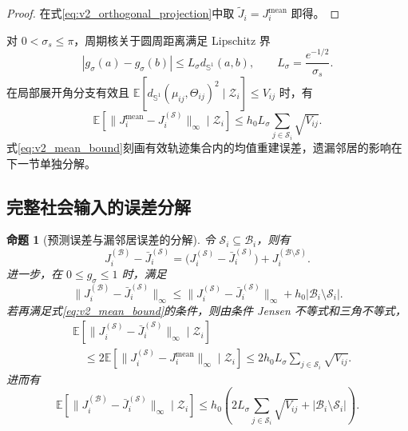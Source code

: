 \documentclass[UTF8,fontset=windows,11pt]{ctexart}
\newtheorem{proposition}[theorem]{命题}
\newcommand{\Sone}{\mathbb S^1}
\newcommand{\E}{\mathbb E}
\begin{document}
\begin{proof}
在式\eqref{eq:v2_orthogonal_projection}中取 $\widetilde J_i=J_i^{\mathrm{mean}}$ 即得。
\end{proof}

对 $0<\sigma_s\le\pi$，周期核关于圆周距离满足 Lipschitz 界
\begin{equation}
 |g_\sigma(a)-g_\sigma(b)|
 \le L_\sigma d_{\Sone}(a,b),
 \qquad L_\sigma=\frac{e^{-1/2}}{\sigma_s}.
 \label{eq:v2_lipschitz_kernel}
\end{equation}
在局部展开角分支有效且 $\E[d_{\Sone}(\mu_{ij},\Theta_{ij})^2\mid\mathcal Z_i]\le V_{ij}$ 时，有
\begin{equation}
 \E[\|J_i^{\mathrm{mean}}-J_i^{(\mathcal S)}\|_\infty\mid\mathcal Z_i]
 \le h_0L_\sigma\sum_{j\in\mathcal S_i}\sqrt{V_{ij}}.
 \label{eq:v2_mean_bound}
\end{equation}
式\eqref{eq:v2_mean_bound}刻画有效轨迹集合内的均值重建误差，遗漏邻居的影响在下一节单独分解。

\subsection{完整社会输入的误差分解}

\begin{proposition}[预测误差与漏邻居误差的分解]
\label{prop:v2_full_decomposition}
令 $\mathcal S_i\subseteq\mathcal B_i$，则有
\begin{equation}
 J_i^{(\mathcal B)}-\bar J_i^{(\mathcal S)}
 =\bigl(J_i^{(\mathcal S)}-\bar J_i^{(\mathcal S)}\bigr)
 +J_i^{(\mathcal B\setminus\mathcal S)}.
 \label{eq:v2_full_decomposition}
\end{equation}
进一步，在 $0\le g_\sigma\le1$ 时，满足
\begin{equation}
 \|J_i^{(\mathcal B)}-\bar J_i^{(\mathcal S)}\|_\infty
 \le
 \|J_i^{(\mathcal S)}-\bar J_i^{(\mathcal S)}\|_\infty
 +h_0|\mathcal B_i\setminus\mathcal S_i|.
 \label{eq:v2_full_bound}
\end{equation}
若再满足式\eqref{eq:v2_mean_bound}的条件，则由条件 Jensen 不等式和三角不等式，
\begin{equation}
 \begin{aligned}
 &\E[\|J_i^{(\mathcal S)}-\bar J_i^{(\mathcal S)}\|_\infty\mid\mathcal Z_i]\\
 &\quad\le
 2\E[\|J_i^{(\mathcal S)}-J_i^{\mathrm{mean}}\|_\infty\mid\mathcal Z_i]
 \le2h_0L_\sigma\sum_{j\in\mathcal S_i}\sqrt{V_{ij}}.
 \end{aligned}
 \label{eq:v2_unc_absolute_bound}
\end{equation}
进而有
\begin{equation}
 \E[\|J_i^{(\mathcal B)}-\bar J_i^{(\mathcal S)}\|_\infty\mid\mathcal Z_i]
 \le h_0\left(
 2L_\sigma\sum_{j\in\mathcal S_i}\sqrt{V_{ij}}
 +|\mathcal B_i\setminus\mathcal S_i|
 \right).
 \label{eq:v2_total_input_bound}
\end{equation}
\end{proposition}
\end{document}
